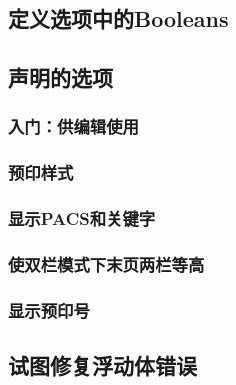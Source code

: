 \documentclass[10pt]{ltxdoc}
\begin{document}
\subsection{定义选项中的Booleans}
\subsection{声明的选项}
\subsubsection{入门：供编辑使用}
\subsubsection{预印样式}
\subsubsection{显示PACS和关键字}
\subsubsection{使双栏模式下末页两栏等高}
\subsubsection{显示预印号}


\subsection{试图修复浮动体错误}
\end{document}
